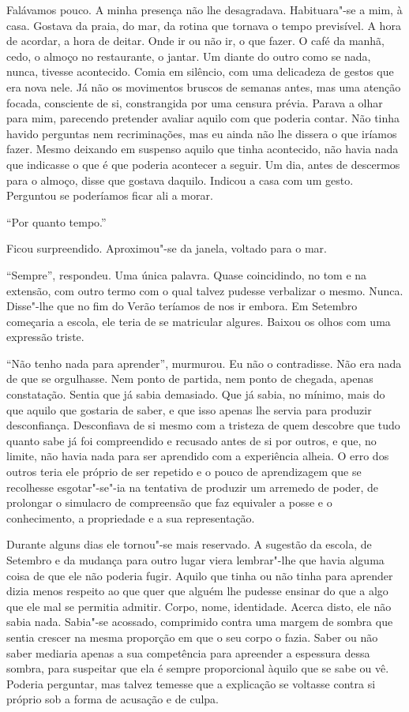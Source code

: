 Falávamos pouco. A minha presença não lhe desagradava. Habituara"-se a
mim, à casa. Gostava da praia, do mar, da rotina que tornava o tempo
previsível. A hora de acordar, a hora de deitar. Onde ir ou não ir, o
que fazer. O café da manhã, cedo, o almoço no restaurante, o jantar.
Um diante do outro como se nada, nunca, tivesse acontecido. Comia em
silêncio, com uma delicadeza de gestos que era nova nele. Já não os
movimentos bruscos de semanas antes, mas uma atenção focada, consciente
de si, constrangida por uma censura prévia. Parava a olhar para mim,
parecendo pretender avaliar aquilo com que poderia contar. Não tinha
havido perguntas nem recriminações, mas eu ainda não lhe dissera o que
iríamos fazer. Mesmo deixando em suspenso aquilo que tinha acontecido,
não havia nada que indicasse o que é que poderia acontecer a seguir. Um
dia, antes de descermos para o almoço, disse que gostava daquilo.
Indicou a casa com um gesto. Perguntou se poderíamos ficar ali a morar.

``Por quanto tempo.''

Ficou surpreendido. Aproximou"-se da janela, voltado para o mar.

``Sempre'',
respondeu. Uma única palavra. Quase coincidindo, no tom e na extensão,
com outro termo com o qual talvez pudesse verbalizar o mesmo. Nunca.
Disse"-lhe que no fim do Verão teríamos de nos ir embora. Em Setembro
começaria a escola, ele teria de se matricular algures. Baixou os olhos
com uma expressão triste.

``Não tenho nada para aprender'',
murmurou. Eu não o contradisse. Não era nada de que se orgulhasse. Nem
ponto de partida, nem ponto de chegada, apenas constatação. Sentia que
já sabia demasiado. Que já sabia, no mínimo, mais do que aquilo que
gostaria de saber, e que isso apenas lhe servia para produzir
desconfiança. Desconfiava de si mesmo com a tristeza de quem descobre
que tudo quanto sabe já foi compreendido e recusado antes de si por
outros, e que, no limite, não havia nada para ser aprendido com a
experiência alheia. O erro dos outros teria ele próprio de ser repetido
e o pouco de aprendizagem que se recolhesse esgotar"-se"-ia na tentativa
de produzir um arremedo de poder, de prolongar o simulacro de
compreensão que faz equivaler a posse e o conhecimento, a propriedade e
a sua representação.

Durante alguns dias ele tornou"-se mais reservado. A sugestão da escola,
de Setembro e da mudança para outro lugar viera lembrar"-lhe que havia
alguma coisa de que ele não poderia fugir. Aquilo que tinha ou não tinha
para aprender dizia menos respeito ao que quer que alguém lhe pudesse
ensinar do que a algo que ele mal se permitia admitir. Corpo, nome,
identidade. Acerca disto, ele não sabia nada. Sabia"-se acossado,
comprimido contra uma margem de sombra que sentia crescer na mesma
proporção em que o seu corpo o fazia. Saber ou não saber mediaria apenas
a sua competência para apreender a espessura dessa sombra, para
suspeitar que ela é sempre proporcional àquilo que se sabe ou vê.
Poderia perguntar, mas talvez temesse que a explicação se voltasse
contra si próprio sob a forma de acusação e de culpa.

